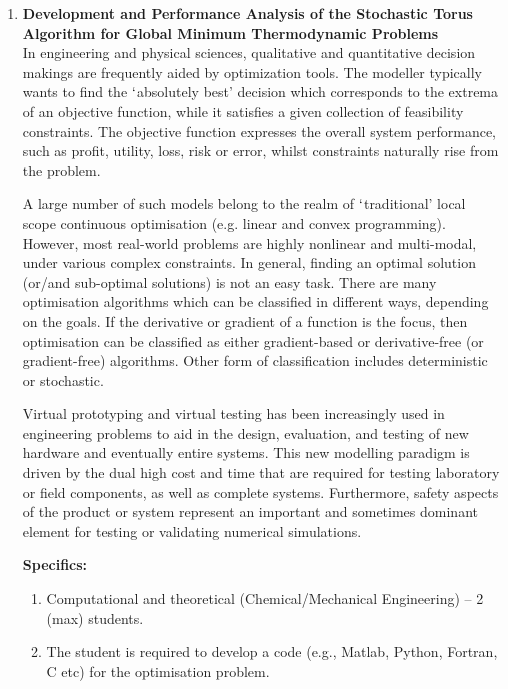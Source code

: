 \documentclass[12pts,a4paper,amsmath,amssymb,floatfix]{article}%
\newcommand{\Chem}{Chemical/Mechanical Engineering}
\begin{document}
\begin{enumerate}[label=\bfseries Project: \arabic*:]
\clearpage

\item {\bf Development and Performance Analysis of the Stochastic Torus Algorithm for Global Minimum Thermodynamic Problems} \\

In engineering and physical sciences, qualitative and quantitative decision makings are frequently aided by optimization tools. The modeller typically wants to find the $\lq$absolutely best’ decision which corresponds to the extrema of an objective function, while it satisfies a given collection of feasibility constraints. The objective function expresses the overall system performance, such as profit, utility, loss, risk or error, whilst constraints naturally rise from the problem.

A large number of such models belong to the realm of $\lq$traditional' local scope continuous optimisation (e.g. linear and convex programming). However, most real-world problems are highly nonlinear and multi-modal, under various complex constraints. In general, finding an optimal solution (or/and sub-optimal solutions) is not an easy task. There are many optimisation algorithms which can be classified in different ways, depending on the goals. If the derivative or gradient of a function is the focus, then optimisation can be classified as either gradient-based or derivative-free (or gradient-free) algorithms. Other form of classification includes deterministic or stochastic.

Virtual prototyping and virtual testing has been increasingly used in engineering problems to aid in the design, evaluation, and testing of new hardware and eventually entire systems. This new modelling paradigm is driven by the dual high cost and time that are required for testing laboratory or field components, as well as complete systems. Furthermore, safety aspects of the product or system represent an important and sometimes dominant element for testing or validating numerical simulations.

\noindent
{\bf Specifics:} 
\begin{enumerate}
\item Computational and theoretical (\Chem) -- 2 (max) students. 
\item The student is required to develop a code (e.g., Matlab, Python, Fortran, C etc) for the optimisation problem.
\end{enumerate} 


\end{enumerate}
\end{document}
